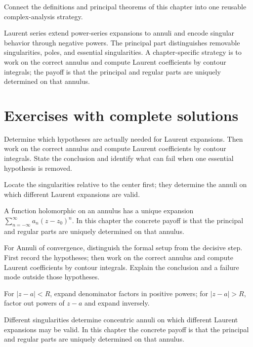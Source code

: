 \begin{problem}\label{prob:iv08-problem-12}
Connect the definitions and principal theorems of this chapter into one reusable complex-analysis strategy.
\end{problem}
\begin{solution}
Laurent series extend power-series expansions to annuli and encode singular behavior through negative powers. The principal part distinguishes removable singularities, poles, and essential singularities. A chapter-specific strategy is to work on the correct annulus and compute Laurent coefficients by contour integrals; the payoff is that the principal and regular parts are uniquely determined on that annulus.
\end{solution}

\section{Exercises with complete solutions}

\begin{exercise}\label{exr:iv08-01}
Determine which hypotheses are actually needed for Laurent expansions. Then work on the correct annulus and compute Laurent coefficients by contour integrals. State the conclusion and identify what can fail when one essential hypothesis is removed.
\end{exercise}
\begin{hint}
Locate the singularities relative to the center first; they determine the annuli on which different Laurent expansions are valid.
\end{hint}
\begin{solution}
A function holomorphic on an annulus has a unique expansion $\sum_{n=-\infty}^{\infty}a_n(z-z_0)^n$. In this chapter the concrete payoff is that the principal and regular parts are uniquely determined on that annulus.
\end{solution}

\begin{exercise}\label{exr:iv08-02}
For Annuli of convergence, distinguish the formal setup from the decisive step. First record the hypotheses; then work on the correct annulus and compute Laurent coefficients by contour integrals. Explain the conclusion and a failure mode outside those hypotheses.
\end{exercise}
\begin{hint}
For \(|z-a|<R\), expand denominator factors in positive powers; for \(|z-a|>R\), factor out powers of \(z-a\) and expand inversely.
\end{hint}
\begin{solution}
Different singularities determine concentric annuli on which different Laurent expansions may be valid. In this chapter the concrete payoff is that the principal and regular parts are uniquely determined on that annulus.
\end{solution}

